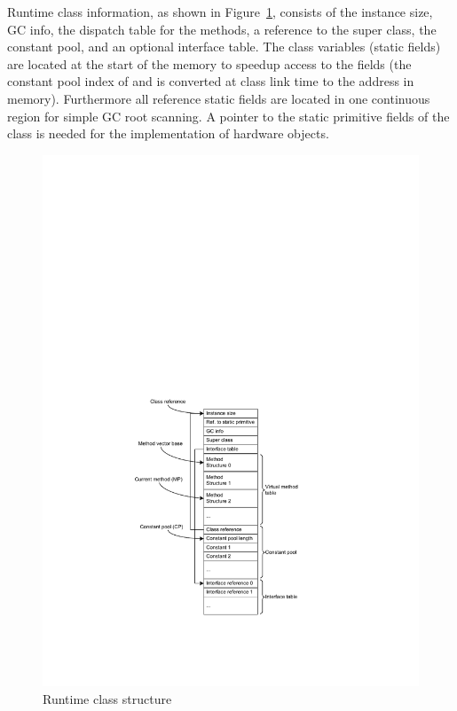 

Runtime class information, as shown in Figure~\ref{fig_jvm_class},
consists of the instance size, GC info, the dispatch table for the
methods, a reference to the super class, the constant pool, and an
optional interface table. The class variables (static fields) are
located at the start of the memory to speedup access to the fields
(the constant pool index of  and  is
converted at class link time to the address in memory). Furthermore
all reference static fields are located in one continuous region for
simple GC root scanning. A pointer to the static primitive fields of
the class is needed for the implementation of hardware objects.

\begin{figure}
    \centering
    \includegraphics[scale=\picscale]{jvm/jvm_class}
    \caption{Runtime class structure}
    \label{fig_jvm_class}
\end{figure}



